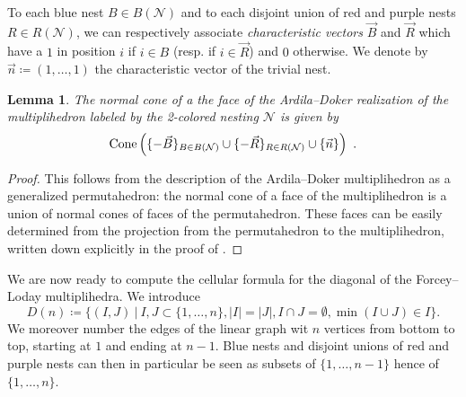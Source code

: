 \documentclass[twoside, 12pt]{amsart}
\newtheorem{lemma}[definition]{Lemma}
\theoremstyle{remark}
\begin{document}
To each blue nest $B \in B(\mathcal{N})$ and to each disjoint union of red and purple nests $R \in R(\mathcal{N})$, we can respectively associate \emph{characteristic vectors} $\vec B$ and $\vec R$ which have a $1$ in position $i$ if $i \in B$ (resp. if $i \in \vec R$) and $0$ otherwise. 
We denote by $\vec n \coloneqq (1,\ldots,1)$ the characteristic vector of the trivial nest. 

\begin{lemma} 
\label{lemma:normalcones}
The normal cone of a the face of the Ardila--Doker realization of the multiplihedron labeled by the 2-colored nesting  $\mathcal{N}$ is given by  \[\operatorname{Cone}\left(\{-\vec B\}_{B \in B(\mathcal{N})} \cup \{-\vec R\}_{R \in R(\mathcal{N})} \cup \{\vec n\} \right) \ . \]
\end{lemma}


\begin{proof} 
This follows from the description of the Ardila--Doker multiplihedron as a generalized permutahedron: 
the normal cone of a face of the multiplihedron is a union of normal cones of faces of the permutahedron. 
These faces can be easily determined from the projection from the permutahedron to the multiplihedron, written down explicitly in the proof of \cite[Theorem 3.3.6]{Doker11}.
\end{proof}

We are now ready to compute the cellular formula for the diagonal of the Forcey--Loday multiplihedra. We introduce \[ D(n)\coloneqq \{(I,J) \ | \ I,J\subset\{1,\ldots,n\}, |I|=|J|, I\cap J=\emptyset, \min(I\cup J)\in I \}. \]
We moreover number the edges of the linear graph wit $n$ vertices from bottom to top, starting at $1$ and ending at $n-1$. Blue nests and disjoint unions of red and purple nests can then in particular be seen as subsets of $\{1,\ldots,n-1\}$ hence of $\{1,\ldots,n\}$.
\end{document}
